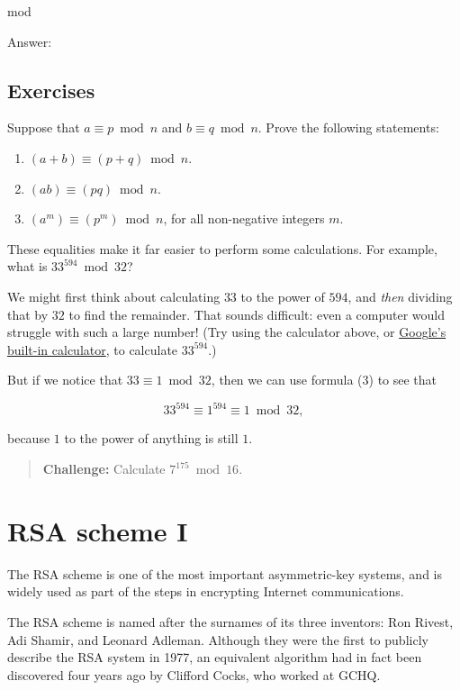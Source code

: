 \documentclass[
  letterpaper,
  DIV=11,
  numbers=noendperiod]{scrreprt}
\providecommand{\tightlist}{%
  \setlength{\itemsep}{0pt}\setlength{\parskip}{0pt}}\usepackage{longtable,booktabs,array}
\begin{document}
\leavevmode{}%
mod

Answer: \protect\hypertarget{answer}{}{}

\hypertarget{exercises}{%
\section{Exercises}\label{exercises}}

Suppose that \(a \equiv p \bmod n\) and \(b \equiv q \bmod n\). Prove
the following statements:

\begin{enumerate}
\def\labelenumi{\arabic{enumi}.}
\tightlist
\item
  \((a + b) \equiv (p + q) \bmod n\).
\item
  \((ab) \equiv (pq) \bmod n\).
\item
  \((a^m) \equiv (p^m) \bmod n\), for all non-negative integers \(m\).
\end{enumerate}

These equalities make it far easier to perform some calculations. For
example, what is \(33^{594} \bmod{32}\)?

We might first think about calculating \(33\) to the power of \(594\),
and \emph{then} dividing that by \(32\) to find the remainder. That
sounds difficult: even a computer would struggle with such a large
number! (Try using the calculator above, or
\href{https://www.google.com/search?q=calculator}{Google's built-in
calculator}, to calculate \(33^{594}\).)

But if we notice that \(33 \equiv 1 \bmod{32}\), then we can use formula
(3) to see that

\[33^{594} \equiv 1^{594} \equiv 1 \bmod{32},\]

because \(1\) to the power of anything is still \(1\).

\begin{quote}
\textbf{Challenge:} Calculate \(7^{175} \bmod{16}\).
\end{quote}

\hypertarget{rsa-scheme-i}{%
\chapter{RSA scheme I}\label{rsa-scheme-i}}

The RSA scheme is one of the most important asymmetric-key systems, and
is widely used as part of the steps in encrypting Internet
communications.

The RSA scheme is named after the surnames of its three inventors: Ron
Rivest, Adi Shamir, and Leonard Adleman. Although they were the first to
publicly describe the RSA system in 1977, an equivalent algorithm had in
fact been discovered four years ago by Clifford Cocks, who worked at
GCHQ.
\end{document}
